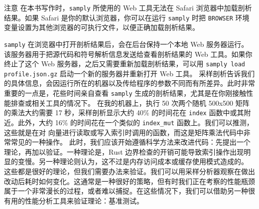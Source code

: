 \begin{myNotic}{注意}
在本书写作时，\texttt{samply} 所使用的 Web 工具无法在 Safari 浏览器中加载剖析结果。如果 Safari 是你的默认浏览器，你可以在运行 \texttt{samply} 时把 \texttt{BROWSER} 环境变量设置为其他浏览器的可执行文件，以便正确加载剖析结果。
\end{myNotic}
\texttt{samply} 在浏览器中打开剖析结果后，会在后台保持一个本地 Web 服务器运行。该服务器用于把源代码和符号解析信息发送给查看剖析结果的 Web 工具。如果你终止了这个 Web 服务器，之后又需要重新加载剖析结果，可以用 \texttt{samply load profile.\allowbreak{}json.\allowbreak{}gz} 启动一个新的服务器并重新打开 Web 工具。
采样剖析告诉我们的具体信息，会因运行所在的机器以及传给程序的参数不同而有所差异。此时非常重要的一点是，花些时间亲自查看 \texttt{samply} 生成的剖析结果，尤其是在你刚接触性能排查或相关工具的情况下。
在我的机器上，执行 50 次两个随机 500x500 矩阵的乘法大约需要 17 秒，采样剖析显示大约 40\% 的时间花在 \texttt{index} 函数中或其附近。此外，大约 16\% 的时间花在一个类似的
\texttt{index\_mut} 函数上。我们可以推测，这些就是在对
\label{idx:idx_f9444fa8}
向量进行读取或写入索引时调用的函数，而这是矩阵乘法代码中非常常见的一种操作。
此时，我们应该开始遵循科学方法来改进代码：先提出一个理论，再加以验证。一种理论是，Rust 边界检查的开销可能导致索引操作出现明显的变慢。另一种理论则认为，这不过是内存访问成本或缓存使用模式造成的。
这些都是很好的理论，但我们需要办法来验证。我们可以用采样分析器观察在做出改动后耗时如何变化。这通常是一种很好的策略，但有时我们正在考察的性能瓶颈属于一个非常漫长的过程，或者难以捕捉。在这些情况下，我们可以借助另一种很有用的性能分析工具来验证理论：基准测试。
